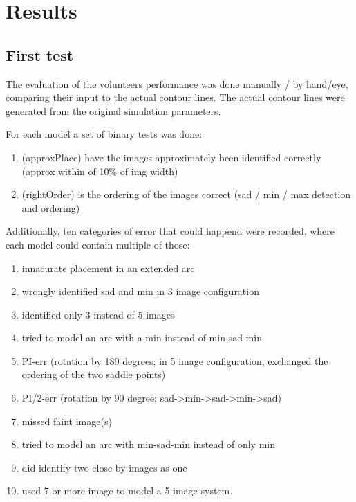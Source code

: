 
\section{Results} \label{sec:results}

\subsection{First test} \label{sec:results.1}

The evaluation of the volunteers performance was done manually / by hand/eye, comparing their input to the actual contour lines.
The actual contour lines were generated from the original simulation parameters.

For each model a set of binary tests was done:

\begin{enumerate}
  \item (approxPlace) have the images approximately been identified correctly (approx within of 10\% of img width)
  \item (rightOrder) is the ordering of the images correct (sad / min / max detection and ordering)
\end{enumerate}

Additionally, ten categories of error that could happend were recorded, where each model could contain multiple of those:

\begin{enumerate}
  \item innacurate placement in an extended arc
  \item wrongly identified sad and min in 3 image configuration
  \item identified only 3 instead of 5 images
  \item tried to model an arc with a min instead of min-sad-min
  \item PI-err (rotation by 180 degrees; in 5 image configuration, exchanged the ordering of the two saddle points)
  \item PI/2-err (rotation by 90 degree; sad->min->sad->min->sad)
  \item missed faint image(s)
  \item tried to model an arc with min-sad-min instead of only min
  \item did identify two close by images as one
  \item used 7 or more image to model a 5 image system.
\end{enumerate}

